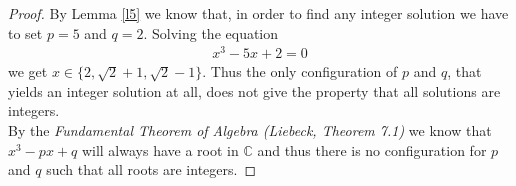 \documentclass{article}
\newcommand{\C}{\mathbb{C}}
\begin{document}
\begin{proof}
By Lemma \ref{l5} we know that, in order to find any integer solution we have to set $p=5$ and $q=2$.
Solving the equation
\begin{align*}
  x^3-5x+2=0
\end{align*}
we get $x\in\{2,\sqrt{2}+ 1, \sqrt{2}-1\}$. Thus the only configuration of $p$ and $q$, that yields an integer solution at all, does not give the property that all solutions are integers.\\
By the \emph{Fundamental Theorem of Algebra (Liebeck, Theorem 7.1)} we know that $x^3-px+q$ will always have a root in $\C$ and thus there is no configuration for $p$ and $q$ such that all roots are integers.
\end{proof}
\end{document}
